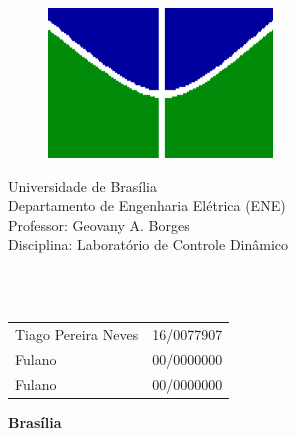 \begin{figure}[h!]
\centering
\includegraphics[scale=0.9]{img/simb_unb.png}
\label{fig:unb}
\end{figure}

\begin{center}
{\LARGE Universidade de Brasília}\\
Departamento de Engenharia Elétrica (ENE)\\
Professor: Geovany A. Borges\\
Disciplina: Laboratório de Controle Dinâmico\\
\end{center}


\vspace{0.18\textheight}

\begin{center}
    \Huge \textbf{\\\thetitle \\}
\end{center}

\vspace*{\fill} %


\begin{table}[H]
    \begin{tabular}{ll}
        Tiago Pereira Neves & 16/0077907 \\
        Fulano & 00/0000000 \\
        Fulano & 00/0000000 \\
    \end{tabular}
\end{table}

\vspace{0.5cm}

\begin{center}
    \textbf{Brasília\\
    \the\year} %
\end{center}

\thispagestyle{empty} %

\newpage
\tableofcontents
\newpage

